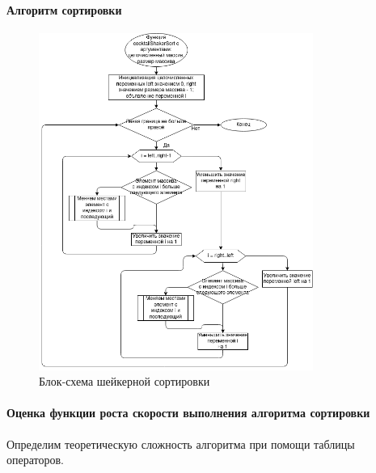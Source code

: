 \documentclass[a4paper, 14pt]{extarticle}
\begin{document}
\paragraph{Алгоритм сортировки}
\begin{figure}[htpb]
  \centering
  \includegraphics[width=0.8\textwidth]{pictures/second_sort_flowchart.png}
  \caption{Блок-схема шейкерной сортировки}
  \label{fig:second_sort_flow}
\end{figure}
\paragraph{Оценка функции роста скорости выполнения алгоритма сортировки}
Определим теоретическую сложность алгоритма при помощи таблицы
операторов.
\end{document}
